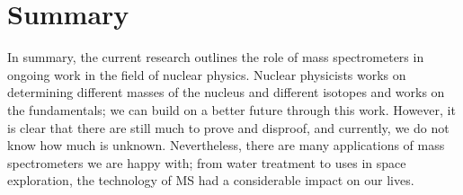 \section{Summary}
 In summary, the current research outlines the role of mass spectrometers in ongoing work in the field of nuclear physics.
 Nuclear physicists works on determining different masses of the nucleus and different isotopes and works on the fundamentals; we can build on a better future through this work.
 However, it is clear that there are still much to prove and disproof, and currently, we do not know how much is unknown.
 Nevertheless, there are many applications of mass spectrometers we are happy with; from water treatment to uses in space exploration, the technology of MS had a considerable impact on our lives.